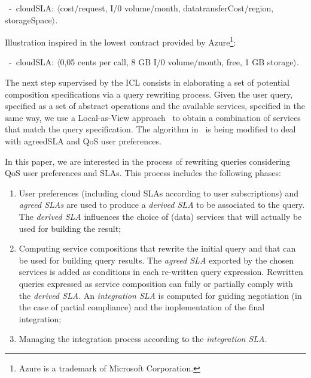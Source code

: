 \begin{trivlist}\sf\footnotesize
 \item[~-~cloudSLA:]  $\langle$cost/request, I/0 volume/month, datatransferCost/region, storageSpace$\rangle$.
 \end{trivlist}
 
Illustration inspired in the lowest contract provided by Azure\footnote{Azure is a trademark of Microsoft Corporation.}: 
 \begin{trivlist}\sf\footnotesize
\item[~-~cloudSLA:]  $\langle$0,05 cents per call, 8 GB I/0 volume/month, free, 1 GB storage$\rangle$. 
\end{trivlist}


 


The next step supervised by the ICL consists in elaborating a set of potential composition specifications via a query rewriting process. Given the user query, specified as a set of abstract operations and the available services, specified in the same way, we use a Local-as-View approach~\cite{CostaAMR13} to obtain a combination of services that match the query specification.
The algorithm in~\cite{CostaAMR13} is being modified to deal with agreedSLA and QoS user preferences.

 

In this paper, we are interested in the process of rewriting queries  considering QoS user preferences and SLAs.
This process includes the following phases: 
\begin{enumerate}
\item  User preferences (including cloud SLAs according to user subscriptions) and \textit{agreed SLAs} are  used to produce a \textit{derived SLA} to be associated to the query. The {\em derived SLA}  influences the choice of (data) services that will actually be used for building the result; 
\item Computing service compositions that rewrite the initial query and that can be used for  building query results. The \textit{agreed SLA} exported by the chosen services is added as  conditions in  each re-written query expression. 
Rewritten queries expressed as service composition can fully or partially comply with the \textit{derived SLA}.  An \textit{integration SLA} is  computed for guiding  negotiation (in the case of partial compliance)  and the implementation of the final integration; 
\item   Managing the integration process according to the \textit{integration SLA}.
\end{enumerate}
 
